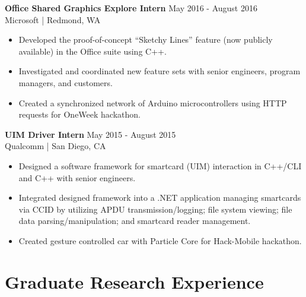 \documentclass[line]{res}
\begin{document}
\begin{resume}
\textbf{Office Shared Graphics Explore Intern} \hfill May 2016 - August 2016
\\
Microsoft | Redmond, WA
\\
\vspace{-3mm}
\begin{itemize}
\item Developed the proof-of-concept ``Sketchy Lines'' feature (now publicly available) in the Office suite using C++.
\item Investigated and coordinated new feature sets with senior engineers, program managers, and customers.
\item Created a synchronized network of Arduino microcontrollers using HTTP requests for OneWeek hackathon.
\end{itemize}

\textbf{UIM Driver Intern} \hfill May 2015 - August 2015
\\
Qualcomm | San Diego, CA
\\
\vspace{-3mm}
\begin{itemize}
\item Designed a software framework for smartcard (UIM) interaction in C++/CLI and C++ with senior engineers.
\item Integrated designed framework into a .NET application managing smartcards via CCID by utilizing APDU transmission/logging; file system viewing; file data parsing/manipulation; and smartcard reader management.
\item Created gesture controlled car with Particle Core for Hack-Mobile hackathon.
\end{itemize}

\pagebreak

\section{\Large{Graduate Research Experience}}
\label{sec:gradexp}
\vspace{2mm}


\end{resume}
\end{document}
